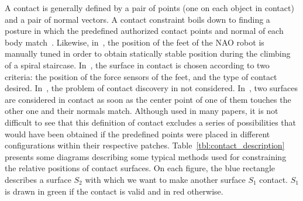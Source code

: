 A contact is generally defined by a pair of points (one on each object in contact) and a pair of normal vectors.
A contact constraint boils down to finding a posture in which the predefined authorized contact points and normal of each body match~\cite{zhang:TePRA:2013}\cite{hauser:ijrr:2008}.
Likewise, in~\cite{osswald:iros:2011}, the position of the feet of the NAO robot is manually tuned in order to obtain statically stable position during the climbing of a spiral staircase.
In~\cite{Chestnutt:2009:BNR:1733023.1733314}, the surface in contact is chosen according to two criteria: the position of the force sensors of the feet, and the type of contact desired.
In~\cite{sentis:itro:2010}, the problem of contact discovery in not considered.
In~\cite{mordatch:acm:2012}, two surfaces are considered in contact as soon as the center point of one of them touches the other one and their normals match.
Although used in many papers, it is not difficult to see that this definition of contact excludes a series of possibilities that would have been obtained if the predefined points were placed in different configurations within their respective patches.
Table~\ref{tbl:contact_description} presents some diagrams describing some typical methods used for constraining the relative positions of contact surfaces.
On each figure, the blue rectangle describes a surface $S_2$ with which we want to make another surface $S_1$ contact. $S_1$ is drawn in green if the contact is valid and in red otherwise.

